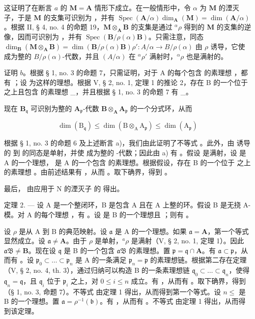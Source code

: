 这证明了在断言 \(a\) 的 \(\mathbf{M} = \mathbf{A}\) 情形下成立。在一般情形中，令 \(\alpha\) 为 \(\mathbf{M}\) 的湮灭子，于是 \(\mathbf{M}\) 的支集可识别为 ，并有 \(\operatorname{Spec}(\mathbf{A}/\alpha)\)\(\dim_{\mathbf{A}}(\mathbf{M}) = \dim(\mathbf{A}/\alpha)\)。根据 II, § 4, no. 4 的命题 19，\(\mathbf{M} \otimes_{\mathbf{A}} \mathbf{B}\) 的支集是通过 \(^{\alpha}\rho\) 得到的 \(\mathbf{M}\) 的支集的逆像，因而可识别为 ，并有 \(\operatorname{Spec}(\mathbf{B}/\rho(\alpha)\mathbf{B})\)。只需注意，同态 \(\dim_{\mathbf{B}}(\mathbf{M} \otimes_{\mathbf{A}} \mathbf{B}) = \dim(\mathbf{B}/\rho(\alpha)\mathbf{B})\)\(\rho': A/\alpha \to B/\rho(\alpha)\) 由 \(\rho\) 诱导，它使  成为整的 \(B/\rho(\alpha)\)-代数，并且 \((A/\alpha)\) 在 \(^{\alpha}\rho'\) 满射时，\(^{\alpha}\rho\) 也是满射的。

证明 \(b\)。根据 § 1, no. 3 的命题 7，只需证明，对于 A 的每个包含  的素理想  ，都有 ；设  为这样的理想。根据 V, § 2, no. 1, 定理 1 的推论 2，存在 B 的一个位于  之上且包含  的素理想 \_，并且根据 § 1, no. 3 的命题 7 有 \_。

现在 \(\mathbf{B}_{\mathfrak{q}}\) 可识别为整的 \(\mathbf{A}_{\mathfrak{p}}\)-代数 \(\mathbf{B} \otimes_{\mathbf{A}} \mathbf{A}_{\mathfrak{p}}\) 的一个分式环，从而

\[
\dim (\mathrm{B} _ {\mathfrak {q}}) \leqslant \dim (\mathrm{B} \otimes_ {\mathrm{A}} \mathrm{A} _ {\mathfrak {p}}) \leqslant \dim (\mathrm{A} _ {\mathfrak {p}})
\]

根据 § 1, no. 3 的命题 6 及上述断言 a)，我们由此证明了不等式 。此外，由  诱导的  到  的同态是单射，并使  成为整的 -代数；因此由 a) 有  。假设  是满射，设  是 A 的一个理想， 是 A 的一个包含  的素理想。根据假设，存在 B 的一个位于  之上的素理想  。由前述结果有  ，从而  。取下确界，得到  。

最后，  由应用于 N 的湮灭子  的  得出。

定理 2. --- 设 A 是一个整闭环，B 是包含 A 且在 A 上整的环。假设 B 是无挠 A-模。对 A 的每个理想  ，有 。设  是 B 的一个理想且 ；则有 。

设 \(\rho\) 是从 A 到 B 的典范映射。设 \(\mathfrak{a}\) 是 A 的一个理想。如果 \(\mathfrak{a} = \mathbf{A}\)，第一个等式显然成立。设 \(\mathfrak{a} \neq \mathbf{A}\)。由于 \(\rho\) 是单射，\({}^{a}\rho\) 是满射（V, § 2, no. 1, 定理 1）。因此 \(\mathfrak{aB} \neq \mathbf{B}\)。现在设 \(\mathfrak{q}\) 是 B 的一个包含 \(\mathfrak{aB}\) 的素理想。置 \(\mathfrak{p} = \mathfrak{q} \cap \mathbf{A}\)。有 \(\mathfrak{a} \subset \mathfrak{p}\)，从而有 。设 \(\mathfrak{p}_0 \subset \ldots \subset \mathfrak{p}_n\) 是 A 的一条满足 \(\mathfrak{p}_n = \mathfrak{p}\) 的素理想链。根据第二存在定理（V, § 2, no. 4, th. 3），通过归纳可以构造 B 的一条素理想链 \(\mathfrak{q}_0 \subset \ldots \subset \mathfrak{q}_n\)，使得 \(\mathfrak{q}_n = \mathfrak{q}\)，且 \(\mathfrak{q}_i\) 位于 \(\mathfrak{p}_i\) 之上，对 \(0 \leqslant i \leqslant n\) 成立。有  ，从而有  。取下确界，得到  （§ 1, no. 3, 命题 7）。不等式  由定理 1 得出，从而得到第一个等式。设 \(n \leqslant\) 是 B 的一个理想。置 \(\mathfrak{a} = \rho^{-1}(\mathfrak{b})\)。有  ，从而有  。不等式  由定理 1 得出，从而得到该定理。

